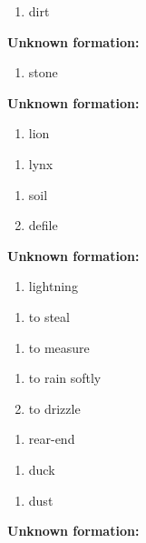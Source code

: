 \begin{enumerate}
\item dirt
\end{enumerate}
\noindent\textbf{Unknown formation:}\\

\begin{enumerate}
\item stone
\end{enumerate}
\noindent\textbf{Unknown formation:}\\

\begin{enumerate}
\item lion
\end{enumerate}
\begin{enumerate}
\item lynx
\end{enumerate}
\begin{enumerate}
\item soil
\item defile
\end{enumerate}
\noindent\textbf{Unknown formation:}\\

\begin{enumerate}
\item lightning
\end{enumerate}
\begin{enumerate}
\item to steal
\end{enumerate}
\begin{enumerate}
\item to measure
\end{enumerate}
\begin{enumerate}
\item to rain softly
\item to drizzle
\end{enumerate}
\begin{enumerate}
\item rear-end
\end{enumerate}
\begin{enumerate}
\item duck
\end{enumerate}
\begin{enumerate}
\item dust
\end{enumerate}
\noindent\textbf{Unknown formation:}\\

